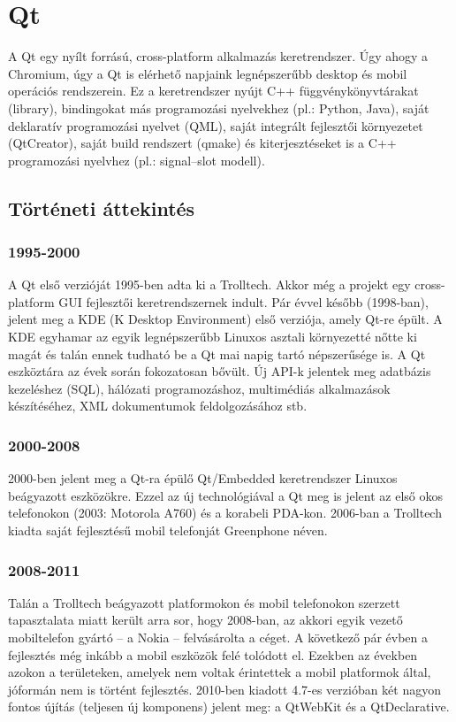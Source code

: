 \documentclass[12pt]{report}
\begin{document}
\section{Qt}
A Qt egy nyílt forrású, cross-platform alkalmazás keretrendszer. Úgy ahogy a Chromium, úgy a
Qt is elérhető napjaink legnépszerűbb desktop és mobil operációs rendszerein. Ez a
keretrendszer nyújt C++ függvénykönyvtárakat (library), bindingokat más programozási
nyelvekhez (pl.: Python, Java), saját deklaratív programozási nyelvet (QML), saját integrált
fejlesztői környezetet (QtCreator), saját build rendszert (qmake) és kiterjesztéseket is a
C++ programozási nyelvhez (pl.: signal--slot modell).
\cite{bib:qt-wiki-about-qt}

\subsection{Történeti áttekintés}
\subsubsection{1995-2000}
A Qt első verzióját 1995-ben adta ki a Trolltech. Akkor még a projekt egy cross-platform GUI
fejlesztői keretrendszernek indult. Pár évvel később (1998-ban), jelent meg a
KDE (K Desktop Environment) első verziója, amely Qt-re épült. A KDE egyhamar az egyik
legnépszerűbb Linuxos asztali környezetté nőtte ki magát és talán ennek tudható be a Qt
mai napig tartó népszerűsége is. A Qt eszköztára az évek során fokozatosan bővült.
Új API-k jelentek meg adatbázis kezeléshez (SQL), hálózati programozáshoz, multimédiás
alkalmazások készítéséhez, XML dokumentumok feldolgozásához stb.

\subsubsection{2000-2008}
2000-ben jelent meg a Qt-ra épülő Qt/Embedded keretrendszer Linuxos beágyazott eszközökre.
Ezzel az új technológiával a Qt meg is jelent az első okos telefonokon (2003: Motorola A760)
és a korabeli PDA-kon. 2006-ban a Trolltech kiadta saját fejlesztésű mobil telefonját
Greenphone néven.

\subsubsection{2008-2011}
Talán a Trolltech beágyazott platformokon és mobil telefonokon szerzett tapasztalata
miatt került arra sor, hogy 2008-ban, az akkori egyik vezető mobiltelefon gyártó -- a Nokia --
felvásárolta a céget. A következő pár évben a fejlesztés még inkább a mobil eszközök
felé tolódott el. Ezekben az években azokon a területeken, amelyek nem voltak érintettek a
mobil platformok által, jóformán nem is történt fejlesztés.
2010-ben kiadott 4.7-es verzióban két nagyon fontos újítás (teljesen új komponens) jelent meg:
a QtWebKit és a QtDeclarative.
\end{document}
